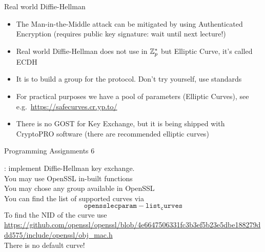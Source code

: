 \documentclass[usenames,dvipsnames, 9pt]{beamer}
\begin{document}
\begin{frame}{Real world Diffie-Hellman}
\Large
\begin{itemize}
	\itemsep 10pt
	\item The Man-in-the-Middle attack can be mitigated by using {\color{Orange} Authenticated Encryption} (requires public key signature: wait until next lecture!)
	\item Real world Diffie-Hellman does not use in ${{\mathbb Z}}_p^*$ but Elliptic Curve, it's called  {\color{Orange} ECDH} 
	\item It is {\color{Orange}{non-trivial}} to build a  {\color{Orange}{secure}} group for the protocol. Don't try yourself, use standards
	\item For practical purposes we have a pool of parameters (Elliptic Curves), see e.g.\ \url{https://safecurves.cr.yp.to/}
	\item There is no GOST for Key Exchange, but it is being shipped with CryptoPRO software (there are recommended elliptic curves)
\end{itemize}

\end{frame}

\begin{frame}{Programming Assignments 6}
\Large

{\color{Orange}{Task}:} implement Diffie-Hellman key exchange. \\[10pt]
You may use OpenSSL in-built functions \\[10pt]
You may chose any group available in OpenSSL\\
You can find the list of supported curves via
\[
\mathtt{openssl ecparam -list_curves}
\]
\noindent To find the NID of the curve use\\ \url{https://github.com/openssl/openssl/blob/4e6647506331fc3b3ef5b23e5dbe188279ddd575/include/openssl/obj_mac.h}\\
 
There is no default curve! 

\end{frame}
\end{document}
